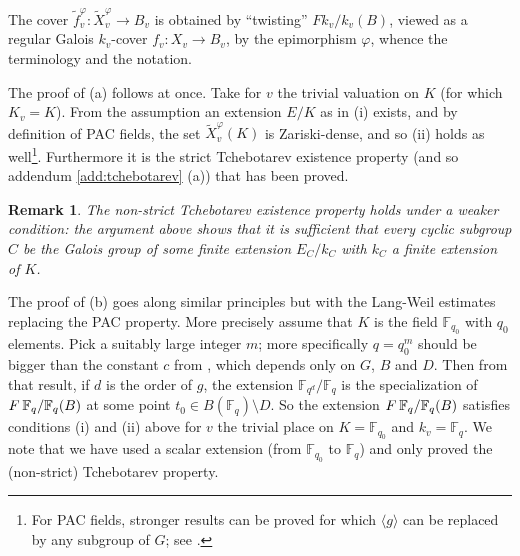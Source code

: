 \documentclass[12pt,english]{amsart}
\newtheorem{twisting lemma}[theorem]{Twisting lemma}
\newtheorem{remark}[theorem]{Remark}
\begin{document}
\noindent
The cover $\widetilde f^{\varphi}_v: \widetilde X_v^{\varphi} \rightarrow B_v$ is obtained by ``twisting'' $Fk_v/k_v(B)$, viewed as a regular Galois $k_v$-cover $f_v: X_v \rightarrow B_v$, by the epimorphism $\varphi$, whence the terminology and the notation. 

The proof of (a) follows at once. Take for $v$ the trivial valuation on $K$ (for which $K_v=K$). From the assumption an extension $E/K$ as in (i) exists, and by definition of PAC fields, the set $\widetilde X_v^{\varphi}(K)$ is Zariski-dense, and so (ii) holds as well\footnote{For PAC fields, stronger results can be proved for which $\langle g\rangle$ can be replaced by any subgroup of $G$; see \cite[corollary 3.4]{DEGha2}.}. Furthermore it is the {strict Tchebotarev existence property} (and so addendum \ref{add:tchebotarev} (a)) that has been proved. 

\begin{remark} \label{rem:nonstrict_PAC}
The non-strict Tchebotarev existence property holds under a weaker condition: the argument above shows that it is sufficient that every cyclic subgroup $C$ be the Galois group of some finite extension $E_C/k_C$ with $k_C$ a finite extension of $K$.
\end{remark}

The proof of (b) goes along similar principles but with the Lang-Weil estimates replacing the PAC property. More precisely assume that $K$ is the field ${\mathbb{F}}_{q_0}$ with $q_0$ elements. Pick 
a suitably large integer $m$; more specifically $q=q_0^m$ should be bigger than the constant $c$ from \cite[corollary 3.5]{DEGha2}, which depends only on $G$, $B$ and $D$. Then from that result, if $d$ is the order of $g$, the extension ${\mathbb{F}}_{q^{d}}/{\mathbb{F}}_q$ is the specialization of $F\hskip 2pt {\mathbb{F}}_q/{\mathbb{F}}_q(B)$ at some point $t_0\in B({\mathbb{F}}_q) \setminus D$. So the extension
$F\hskip 2pt {\mathbb{F}}_q/{\mathbb{F}}_q(B)$ satisfies conditions (i) and (ii) above for $v$ the trivial place on $K={\mathbb{F}}_{q_0}$ and $k_v={\mathbb{F}}_q$. We note that we have used a scalar extension (from ${\mathbb{F}}_{q_0}$ to ${\mathbb{F}}_q$) and only proved the {(non-strict) Tchebotarev property}.
\end{document}
